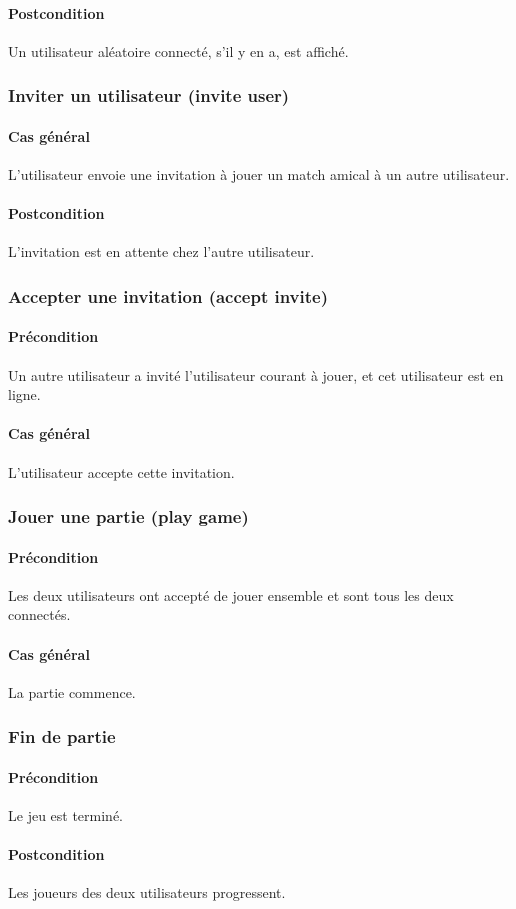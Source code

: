 \paragraph{Postcondition} Un utilisateur aléatoire connecté, s'il y en a, est affiché.

\subsubsection{Inviter un utilisateur (invite user)}

\paragraph{Cas général} L'utilisateur envoie une invitation à jouer un match amical à un autre utilisateur.
\paragraph{Postcondition} L'invitation est en attente chez l'autre utilisateur.

\subsubsection{Accepter une invitation (accept invite)}

\paragraph{Précondition} Un autre utilisateur a invité l'utilisateur courant à jouer, et cet utilisateur est en ligne.
\paragraph{Cas général} L'utilisateur accepte cette invitation.

\subsubsection{Jouer une partie (play game)}

\paragraph{Précondition} Les deux utilisateurs ont accepté de jouer ensemble et sont tous les deux connectés.
\paragraph{Cas général} La partie commence.

\subsubsection{Fin de partie}

\paragraph{Précondition} Le jeu est terminé.
\paragraph{Postcondition} Les joueurs des deux utilisateurs progressent.
